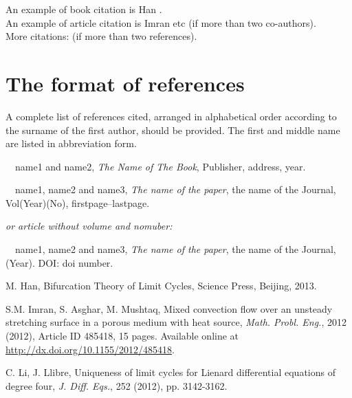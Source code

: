 \documentclass{swufeMath}
\begin{document}
\vskip 2mm
\vskip 2mm
\noindent An example of book citation is Han \cite{H2013}. \\
An example of article citation is  Imran etc \cite[p. 11-13]{ss2012}
 (if more than two co-authors).\\
More citations: \cite{H2013,ss2012,ll2012} (if more than two references).

\section*{The format of references}
A complete list of references cited, arranged in alphabetical order according to the surname of the first
author, should be provided. The first and middle name are listed in abbreviation form.

\vskip 3mm
\vskip 2mm
\noindent [1] ~~name1 and name2,  {\em The Name of The Book}, Publisher, address, year.

\vskip 3mm
\vskip 2mm
\noindent [2] ~~name1, name2 and name3, {\em The name of the paper}, the name of the Journal, Vol(Year)(No), firstpage--lastpage.\par
\vskip 2mm
 {\it or article without volume and nomuber:}\par
\vskip 2mm
\noindent [3] ~~name1, name2 and name3, {\em The name of the paper}, the name of the Journal, (Year). DOI: doi number.





\begin{thebibliography}{99}
M. Han, Bifurcation Theory of Limit Cycles, Science Press, Beijing, 2013.


S.M. Imran, S. Asghar, M. Mushtaq, Mixed convection flow over an unsteady
stretching surface in a porous medium with heat source, {\em Math. Probl. Eng.},
2012 (2012), Article ID 485418, 15 pages. Available online at \url{http://dx.doi.org/10.1155/2012/485418}.


C. Li, J. Llibre, Uniqueness of limit cycles for Lienard differential
equations of degree four, {\em J. Diff. Eqs.}, 252 (2012), pp. 3142-3162.
\end{thebibliography}
\end{document}
